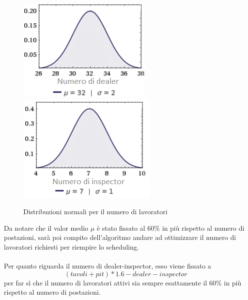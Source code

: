     \begin{figure}[!htb]
        \begin{widepage}
        \centering
        \includegraphics[width=.49\textwidth]{../immagini/gauss_dealer_w.png}\hfil
        \includegraphics[width=.49\textwidth]{../immagini/gauss_inspector_w.png}
        \caption{Distribuzioni normali per il numero di lavoratori}
        \end{widepage}
    \end{figure}
    \FloatBarrier
    \noindent
    Da notare che il valor medio $\mu$ è stato fissato al 60\% in più rispetto al numero di postazioni, sarà poi compito dell'algoritmo andare ad ottimizzare il numero di lavoratori richiesti per riempire lo scheduling. \\
    \\
    Per quanto riguarda il numero di dealer-inspector, esso viene fissato a \[(tavoli + pit) * 1.6 - dealer - inspector\] per far sì che il numero di lavoratori attivi sia sempre esattamente il 60\% in più rispetto al numero di postazioni.
    \clearpage
